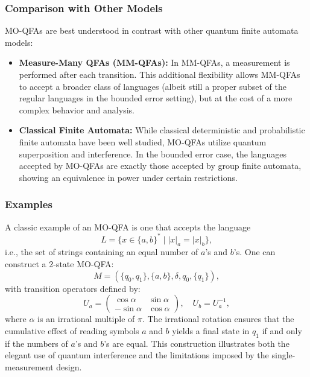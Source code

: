 \subsubsection{Comparison with Other Models}
MO-QFAs are best understood in contrast with other quantum finite automata models:
\begin{itemize}
  \item \textbf{Measure-Many QFAs (MM-QFAs):} In MM-QFAs, a measurement is performed after each transition. This additional flexibility allows MM-QFAs to accept a broader class of languages (albeit still a proper subset of the regular languages in the bounded error setting), but at the cost of a more complex behavior and analysis.
  \item \textbf{Classical Finite Automata:} While classical deterministic and probabilistic finite automata have been well studied, MO-QFAs utilize quantum superposition and interference. In the bounded error case, the languages accepted by MO-QFAs are exactly those accepted by group finite automata, showing an equivalence in power under certain restrictions.
\end{itemize}

\subsubsection{Examples}
A classic example of an MO-QFA is one that accepts the language 
\[
L = \{ x \in \{a,b\}^* \mid |x|_a = |x|_b \},
\]
i.e., the set of strings containing an equal number of \(a\)'s and \(b\)'s. One can construct a 2-state MO-QFA:
\[
M = (\{q_0, q_1\}, \{a,b\}, \delta, q_0, \{q_1\}),
\]
with transition operators defined by:
\[
U_a = \begin{pmatrix} \cos\alpha & \sin\alpha \\ -\sin\alpha & \cos\alpha \end{pmatrix}, \quad
U_b = U_a^{-1},
\]
where \(\alpha\) is an irrational multiple of \(\pi\). The irrational rotation ensures that the cumulative effect of reading symbols \(a\) and \(b\) yields a final state in \(q_1\) if and only if the numbers of \(a\)'s and \(b\)'s are equal. This construction illustrates both the elegant use of quantum interference and the limitations imposed by the single-measurement design.
